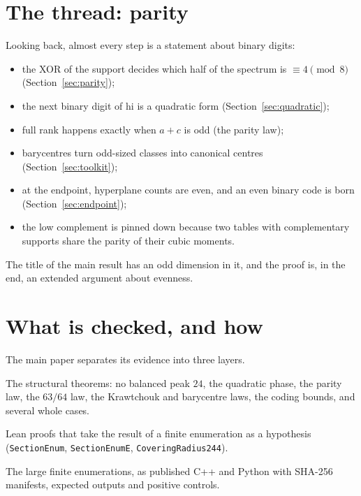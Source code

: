 \documentclass[11pt]{article}
\theoremstyle{definition}
\theoremstyle{remark}
\newcommand{\hi}{\mathrm{hi}}
\newcommand{\code}[1]{\texttt{#1}}
\DeclareRobustCommand{\_}{\textunderscore\allowbreak}
\begin{document}
\section{The thread: parity}
\label{sec:thread}

Looking back, almost every step is a statement about binary digits:
\begin{itemize}[nosep]
  \item the XOR of the support decides which half of the spectrum is $\equiv4\pmod 8$ (Section~\ref{sec:parity});
  \item the next binary digit of $\hi$ is a quadratic form (Section~\ref{sec:quadratic});
  \item full rank happens exactly when $a+c$ is odd (the parity law);
  \item barycentres turn odd-sized classes into canonical centres (Section~\ref{sec:toolkit});
  \item at the endpoint, hyperplane counts are even, and an even binary code is born (Section~\ref{sec:endpoint});
  \item the low complement is pinned down because two tables with complementary supports share the parity of their cubic moments.
\end{itemize}
The title of the main result has an odd dimension in it, and the proof is, in the end, an extended argument about evenness.

\section{What is checked, and how}
\label{sec:trust}

The main paper separates its evidence into three layers.
\begin{description}[nosep, leftmargin=1.5em]
  \item[Layer A: Lean kernel only.] The structural theorems: no balanced peak $24$, the quadratic phase, the parity law, the $63/64$ law, the Krawtchouk and barycentre laws, the coding bounds, and several whole cases.
  \item[Layer B: Lean plus named finite hypotheses.] Lean proofs that take the result of a finite enumeration as a hypothesis (\code{SectionEnum}, \code{SectionEnumE}, \code{CoveringRadius244}).
  \item[Layer C: replay packets.] The large finite enumerations, as published C++ and Python with SHA-256 manifests, expected outputs and positive controls.
\end{description}
\end{document}
